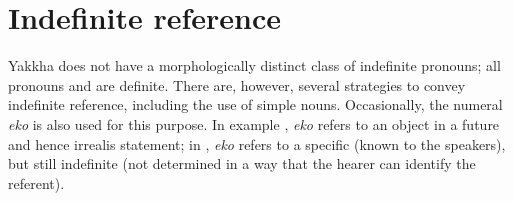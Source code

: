 \begin{table}[htp]
\end{table}

	

\section{Indefinite reference}\label{sec-indef}

Yakkha does not have a morphologically distinct class of indefinite pronouns; all pronouns and  are definite. There are, however,  several strategies to convey indefinite reference, including the use of simple nouns. Occasionally, the numeral \emph{eko}  is also used for this purpose. In example \Next[a], \emph{eko} refers to an object in a future and hence irrealis statement; in \Next[b], \emph{eko} refers to a specific (known to the speakers), but still indefinite  (not determined in a way that the hearer can identify the referent).

